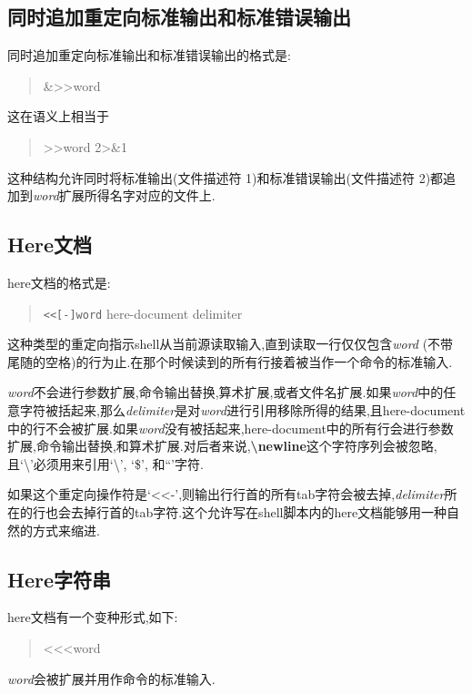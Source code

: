 \documentclass[draft,openany]{book}
\begin{document}
\begin{CJK}{UTF8}{gbsn}
    \subsection{同时追加重定向标准输出和标准错误输出}
    同时追加重定向标准输出和标准错误输出的格式是:
    \begin{quote}
        \&\textgreater\textgreater{}word
    \end{quote}
    这在语义上相当于
    \begin{quote}
        \textgreater\textgreater{}word 2\textgreater\&1
    \end{quote}
    这种结构允许同时将标准输出(文件描述符 1)和标准错误输出(文件描述符 2)都追加到\emph{word}扩展所得名字对应的文件上.

    \subsection{Here文档}
    here文档的格式是:
    \begin{quote}
        \verb+<<[-]word+
            here-document
        delimiter
    \end{quote}
    这种类型的重定向指示shell从当前源读取输入,直到读取一行仅仅包含\emph{word} (不带尾随的空格)的行为止.在那个时候读到的所有行接着被当作一个命令的标准输入.\par
    \emph{word}不会进行参数扩展,命令输出替换,算术扩展,或者文件名扩展.如果\emph{word}中的任意字符被括起来,那么\emph{delimiter}是对\emph{word}进行引用移除所得的结果,且here-document中的行不会被扩展.如果\emph{word}没有被括起来,here-document中的所有行会进行参数扩展,命令输出替换,和算术扩展.对后者来说,\textbf{\textbackslash newline}这个字符序列会被忽略,且`\textbackslash'必须用来引用`\textbackslash', `\$', 和``'字符.\par
    如果这个重定向操作符是`\textless\textless{}-',则输出行行首的所有tab字符会被去掉,\emph{delimiter}所在的行也会去掉行首的tab字符.这个允许写在shell脚本内的here文档能够用一种自然的方式来缩进.

    \subsection{Here字符串}
    here文档有一个变种形式,如下:
    \begin{quote}
        \textless\textless\textless word
    \end{quote}
    \emph{word}会被扩展并用作命令的标准输入.


\end{CJK}
\end{document}
